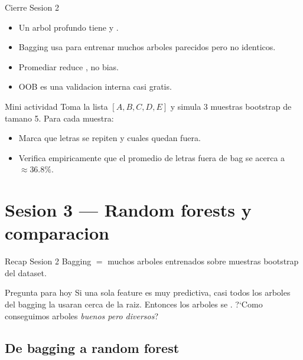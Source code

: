 \begin{frame}{Cierre Sesion 2}
\begin{itemize}\small
  \item Un arbol profundo tiene  y .
  \item Bagging usa  para entrenar muchos arboles parecidos pero no identicos.
  \item Promediar reduce , no bias.
  \item OOB es una validacion interna casi gratis.
\end{itemize}

\vspace{0.4em}
\begin{block}{Mini actividad}
\small
Toma la lista $[A,B,C,D,E]$ y simula 3 muestras bootstrap de tamano 5. Para cada muestra:
\begin{itemize}\footnotesize
  \item Marca que letras se repiten y cuales quedan fuera.
  \item Verifica empiricamente que el promedio de letras fuera de bag se acerca a $\approx 36.8\%$.
\end{itemize}
\end{block}
\end{frame}

\section[Random forests]{Sesion 3 — Random forests y comparacion\label{sec:rf-w15}}

\begin{frame}{Recap Sesion 2}
Bagging $=$ muchos arboles entrenados sobre muestras bootstrap del dataset.

\vspace{0.4em}
\begin{block}{Pregunta para hoy}
\small
Si una sola feature es muy predictiva, casi todos los arboles del bagging la usaran cerca de la raiz. Entonces los arboles se . ?`Como conseguimos arboles \emph{buenos pero diversos}?
\end{block}
\end{frame}

\subsection{De bagging a random forest}

